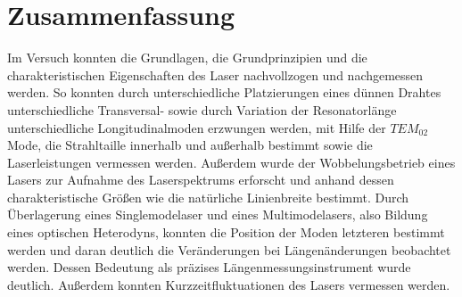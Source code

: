 \documentclass[a4paper,twoside,final]{article}
\begin{document}
\section{Zusammenfassung}
Im Versuch konnten die Grundlagen, die Grundprinzipien und die charakteristischen Eigenschaften des Laser nachvollzogen und nachgemessen werden. So konnten durch unterschiedliche Platzierungen eines dünnen Drahtes unterschiedliche Transversal- sowie durch Variation der Resonatorlänge unterschiedliche Longitudinalmoden erzwungen werden, mit Hilfe der $TEM_02$ Mode, die Strahltaille innerhalb und außerhalb bestimmt sowie die Laserleistungen vermessen werden. Außerdem wurde der Wobbelungsbetrieb eines Lasers zur Aufnahme des Laserspektrums erforscht und anhand dessen charakteristische Größen wie die natürliche Linienbreite bestimmt. Durch Überlagerung eines Singlemodelaser und eines Multimodelasers, also Bildung eines optischen Heterodyns, konnten die Position der Moden letzteren bestimmt werden und daran deutlich die Veränderungen bei Längenänderungen beobachtet werden. Dessen Bedeutung als präzises Längenmessungsinstrument wurde deutlich. Außerdem konnten Kurzzeitfluktuationen des Lasers vermessen werden.

\appendix
\end{document}
